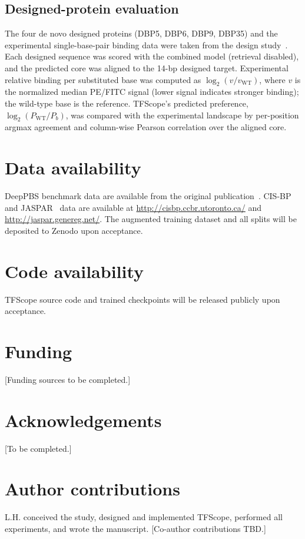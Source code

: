 \documentclass[11pt,letterpaper]{article}
\begin{document}
\subsection*{Designed-protein evaluation}
The four de novo designed proteins (DBP5, DBP6, DBP9, DBP35) and the experimental
single-base-pair binding data were taken from the design study~\cite{Glasscock2025}.
Each designed sequence was scored with the combined model (retrieval disabled), and the
predicted core was aligned to the 14-bp designed target. Experimental relative binding
per substituted base was computed as $\log_2(v/v_{\text{WT}})$, where $v$ is the
normalized median PE/FITC signal (lower signal indicates stronger binding); the
wild-type base is the reference. TFScope's predicted preference, $\log_2(P_{\text{WT}}/P_b)$,
was compared with the experimental landscape by per-position argmax agreement and
column-wise Pearson correlation over the aligned core.

\section*{Data availability}
DeepPBS benchmark data are available from the original publication~\cite{Mitra2024}.
CIS-BP~\cite{Weirauch2014} and JASPAR~\cite{CastroMondragon2022} data are available
at \url{http://cisbp.ccbr.utoronto.ca/} and \url{http://jaspar.genereg.net/}. The
augmented training dataset and all splits will be deposited to Zenodo upon
acceptance.

\section*{Code availability}
TFScope source code and trained checkpoints will be released publicly upon
acceptance.

\section*{Funding}
[Funding sources to be completed.]

\section*{Acknowledgements}
[To be completed.]

\section*{Author contributions}
L.H. conceived the study, designed and implemented TFScope, performed all
experiments, and wrote the manuscript. [Co-author contributions TBD.]
\end{document}
